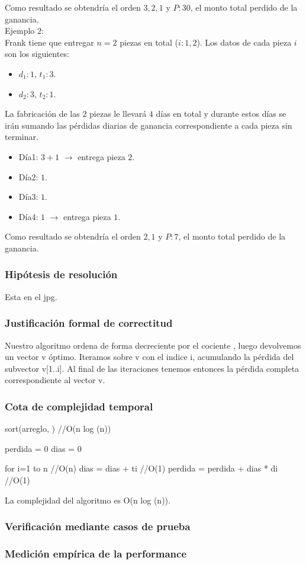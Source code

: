\documentclass[11pt, a4paper, twoside]{article}
\begin{document}
Como resultado se obtendr\'ia el orden $3,2,1$ y $P:30$, el monto total perdido de la ganancia. \\

Ejemplo $2$: \\

Frank tiene que entregar $n=2$ piezas en total ($i:1,2$). Los datos de cada pieza $i$ son los siguientes: 

\begin{itemize}
\item $d_1:1$, $t_1:3$. 
\item $d_2:3$, $t_2:1$. 
\end{itemize}  
    
La fabricaci\'on de las $2$ piezas le llevar\'a $4$ d\'ias en total y durante estos d\'ias se ir\'an sumando las p\'erdidas diarias de ganancia correspondiente a cada pieza sin terminar. 

\begin{itemize}
\item D\'ia1: $3+1$ $\rightarrow$ entrega pieza $2$. 
\item D\'ia2: $1$. 
\item D\'ia3: $1$.
\item D\'ia4: $1$ $\rightarrow$ entrega pieza $1$.
\end{itemize}  	
	
Como resultado se obtendr\'ia el orden $2,1$ y $P:7$, el monto total perdido de la ganancia. 

\subsubsection{Hipótesis de resolución}
Esta en el jpg.
\subsubsection{Justificación formal de correctitud}
Nuestro algoritmo ordena de forma decreciente por el cociente \pi, luego devolvemos un vector v \'optimo. Iteramos sobre v con el indice i, acumulando la p\'erdida del subvector v[1..i]. Al final de las iteraciones tenemos entonces la p\'erdida completa correspondiente al vector v.
\subsubsection{Cota de complejidad temporal}
sort(arreglo, \pi) //O(n log (n))

perdida = 0
dias = 0

for i=1 to n    //O(n)
    dias = dias + ti    //O(1)
    perdida = perdida + dias * di   //O(1)

La complejidad del algoritmo es O(n log (n)).


\subsubsection{Verificación mediante casos de prueba}

\subsubsection{Medición empírica de la performance}

\end{document}

